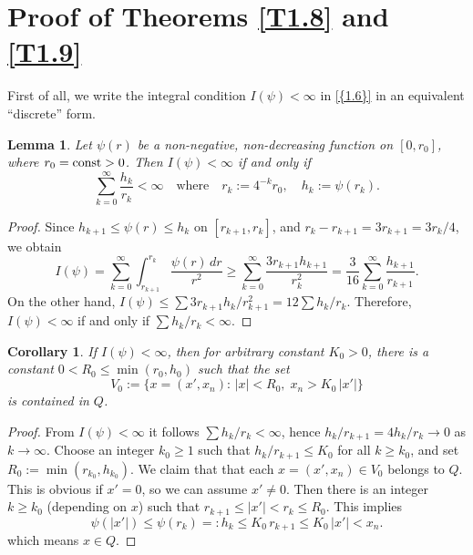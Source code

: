 \documentclass[regno,12pt]{amsart}
\newtheorem{lemma}[theorem]{Lemma}
\newtheorem{corollary}[theorem]{Corollary}
\theoremstyle{definition}
\theoremstyle{remark}
\begin{document}
{\section{{Proof of Theorems \ref{T1.8} and \ref{T1.9}}}
\setcounter{equation}{0}} \label{S.3}

First of all, we write the integral condition $I(\psi)<{\infty}$ in {\eqref{{1.6}}} in an equivalent ``discrete'' form.

\begin{lemma}\label{L3.1}
    Let $\psi(r)$ be a non-negative, non-decreasing function on $[0,r_0]$, where $r_0={{\rm const}}>0$. Then $I(\psi)<{\infty}$ if and only if \begin{equation}\label{3.1}
    \sum_{k=0}^{\infty}\frac{h_k}{r_k}<{\infty}{\quad\text{{where}}\quad}
    r_k:=4^{-k}r_0,\quad h_k:=\psi(r_k).
    \end{equation}
\end{lemma}

\begin{proof}
    Since $h_{k+1}\le\psi(r)\le h_k$ on $[r_{k+1},r_k]$, and $r_k-r_{k+1}=3r_{k+1}=3r_k/4$, we obtain
    \[I(\psi)=\sum_{k=0}^{\infty}\int_{r_{k+1}}^{r_k}\frac{\psi(r)\,dr}{r^2}
    \ge\sum_{k=0}^{\infty}\frac{3r_{k+1}h_{k+1}}{r_k^2}
    =\frac{3}{16} \sum_{k=0}^{\infty}\frac{h_{k+1}}{r_{k+1}}.\]
    On the other hand, $I(\psi)\le\sum 3r_{k+1}h_k/r_{k+1}^2
    =12\sum h_k/r_k$. Therefore, $I(\psi)<{\infty}$ if and only if $\sum h_k/r_k<{\infty}$.
\end{proof}

\begin{corollary}\label{C3.2}
    If $I(\psi)<{\infty}$, then for arbitrary constant $K_0>0$, there is a constant $0<R_0\le \min(r_0,h_0)$ such that the set
    \[ V_0:=\{x=(x',x_n):\,|x|<R_0,\;x_n>K_0\,|x'|\}\]
    is contained in $Q$.
\end{corollary}

\begin{proof}
    From $I(\psi)<{\infty}$ it follows $\sum h_k/r_k<{\infty}$, hence $h_k/r_{k+1}=4h_k/r_k\to 0$ as $k\to{\infty}$. Choose an integer $k_0\ge 1$ such that $h_k/r_{k+1}\le K_0$ for all $k\ge k_0$, and set $R_0:=\min(r_{k_0},h_{k_0})$. We claim that that each $x=(x',x_n)\in V_0$ belongs to $Q$. This is obvious if $x'=0$, so we can assume $x'\ne 0$. Then there is an integer $k\ge k_0$ (depending on $x$) such that $r_{k+1}\le |x'|<r_k\le R_0$. This implies
    \[\psi(|x'|)\le \psi(r_k)=:h_k\le K_0\,r_{k+1}\le K_0\,|x'|<x_n.\]
    which means $x\in Q$.
\end{proof}
\end{document}
